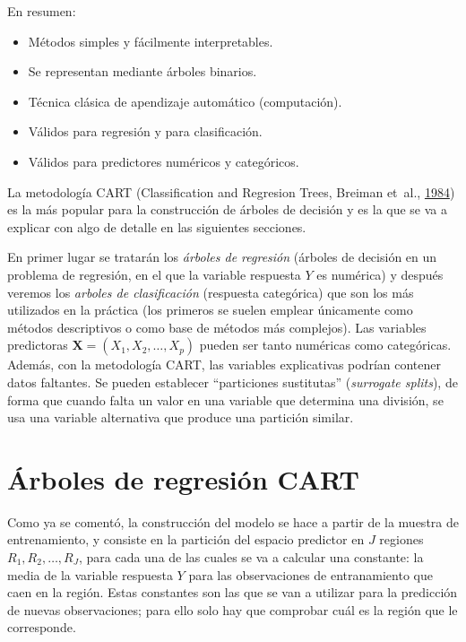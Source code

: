 \documentclass[
  spanish,
]{book}
\theoremstyle{break}
\theoremstyle{definition}
\theoremstyle{definition}
\theoremstyle{definition}
\theoremstyle{remark}
\begin{document}
En resumen:

\begin{itemize}
\item
  Métodos simples y fácilmente interpretables.
\item
  Se representan mediante árboles binarios.
\item
  Técnica clásica de apendizaje automático (computación).
\item
  Válidos para regresión y para clasificación.
\item
  Válidos para predictores numéricos y categóricos.
\end{itemize}

La metodología CART (Classification and Regresion Trees, Breiman et~al., \protect\hyperlink{ref-breiman1984classification}{1984}) es la más popular para la construcción de árboles de decisión y es la que se va a explicar con algo de detalle en las siguientes secciones.

En primer lugar se tratarán los \emph{árboles de regresión} (árboles de decisión en un problema de regresión, en el que la variable respuesta \(Y\) es numérica) y después veremos los \emph{arboles de clasificación} (respuesta categórica) que son los más utilizados en la práctica (los primeros se suelen emplear únicamente como métodos descriptivos o como base de métodos más complejos).
Las variables predictoras \(\mathbf{X}=(X_1, X_2, \ldots, X_p)\) pueden ser tanto numéricas como categóricas.
Además, con la metodología CART, las variables explicativas podrían contener datos faltantes.
Se pueden establecer ``particiones sustitutas'' (\emph{surrogate splits}), de forma que cuando falta un valor en una variable que determina una división, se usa una variable alternativa que produce una partición similar.

\hypertarget{uxe1rboles-de-regresiuxf3n-cart}{%
\section{Árboles de regresión CART}\label{uxe1rboles-de-regresiuxf3n-cart}}

Como ya se comentó, la construcción del modelo se hace a partir de la muestra de entrenamiento, y
consiste en la partición del espacio predictor en \(J\) regiones
\(R_1, R_2, \ldots, R_J\), para cada una de las cuales se va a calcular una constante:
la media de la variable respuesta \(Y\) para las observaciones de entranamiento que
caen en la región. Estas constantes son las que se van a utilizar para
la predicción de nuevas observaciones; para ello solo hay que comprobar cuál es
la región que le corresponde.
\end{document}
